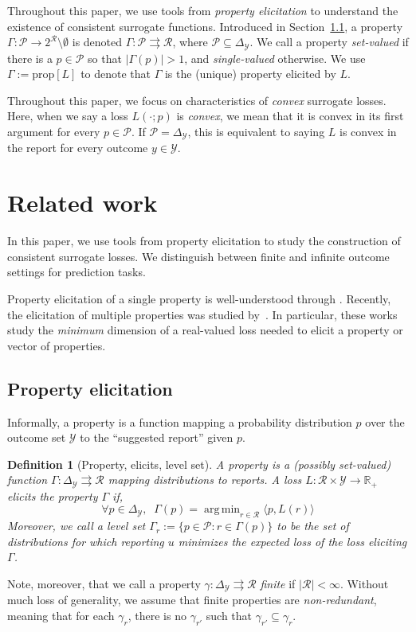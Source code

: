 \documentclass{article}
\newcommand{\reals}{\mathbb{R}}
\newcommand{\simplex}{\Delta_\Y}
\newcommand{\prop}[1]{\mathrm{prop}[#1]}
\renewcommand{\P}{\mathcal{P}}
\newcommand{\R}{\mathcal{R}}
\newcommand{\Y}{\mathcal{Y}}
\newcommand{\inprod}[2]{\langle #1, #2 \rangle}
\newcommand{\toto}{\rightrightarrows}
\newtheorem{definition}{Definition}
\DeclareMathOperator*{\argmin}{arg\,min}
\begin{document}
Throughout this paper, we use tools from \emph{property elicitation} to understand the existence of consistent surrogate functions.
Introduced in Section~\ref{subsec:properties}, a property $\Gamma: \P \to 2^\R \setminus \emptyset$ is denoted $\Gamma:\P \toto \R$, where $\P \subseteq \simplex$.
We call a property \emph{set-valued} if there is a $p \in \P$ so that $|\Gamma(p)| > 1$, and \emph{single-valued} otherwise.
We use $\Gamma := \prop{L}$ to denote that $\Gamma$ is the (unique) property elicited by $L$.

Throughout this paper, we focus on characteristics of \emph{convex} surrogate losses.
Here, when we say a loss $L(\cdot; p)$ is \emph{convex}, we mean that it is convex in its first argument for every $p \in \P$.
If $\P = \simplex$, this is equivalent to saying $L$ is convex in the report for every outcome $y \in \Y$.

\section{Related work}\label{sec:related-work}
In this paper, we use tools from property elicitation to study the construction of consistent surrogate losses.
We distinguish between finite and infinite outcome settings for prediction tasks.

Property elicitation of a single property is well-understood through \cite{savage1971elicitation,osband1985information-eliciting,lambert2008eliciting, lambert2009eliciting, lambert2018elicitation}.
Recently, the elicitation of multiple properties was studied by~\cite{frongillo2015vector-valued,frongillo2015elicitation,fissler2015higher}.
In particular, these works study the \emph{minimum} dimension of a real-valued loss needed to elicit a property or vector of properties.


\subsection{Property elicitation}\label{subsec:properties}
Informally, a property is a function mapping a probability distribution $p$ over the outcome set $\Y$ to the ``suggested report'' given $p$.

\begin{definition}[Property, elicits, level set]
	A \emph{property} is a (possibly set-valued) function $\Gamma : \simplex \toto \R$ mapping distributions to reports.
	A loss $L : \R \times \Y \to \reals_+$ \emph{elicits} the property $\Gamma$ if,
	\begin{equation}
	\forall p \in \simplex, \;\; \Gamma(p) = \argmin_{r \in \R}\inprod{p}{L(r)}
	\end{equation}
	Moreover, we call a \emph{level set} $\Gamma_r := \{p \in \P : r \in \Gamma(p)\}$ to be the set of distributions for which reporting $u$ minimizes the expected loss of the loss eliciting $\Gamma$.
\end{definition}
Note, moreover, that we call a property $\gamma: \simplex \toto \R$ \emph{finite} if $|\R| < \infty$.
Without much loss of generality, we assume that finite properties are \emph{non-redundant}, meaning that for each $\gamma_r$, there is no $\gamma_{r'}$ such that $\gamma_{r'} \subseteq \gamma_r$.
\end{document}
